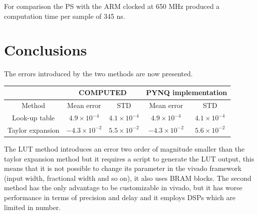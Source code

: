 \documentclass[12pt]{article}
\begin{document}
For comparison the PS with the ARM clocked at 650 MHz produced a computation time per sample of 345 ns.

\section{Conclusions}

The errors introduced by the two methods are now presented.
\begin{table}[h]
\begin{tabular}{c||cc|cc}
&\multicolumn{2}{c|}{COMPUTED}&\multicolumn{2}{c}{PYNQ implementation} \\ \hline 
Method           & Mean error  & STD & Mean error  & STD  \\ \hline
Look-up table    & $4.9\times 10^{-4}$ & $4.1\times 10^{-4}$  & $4.9\times 10^{-4}$ & $4.1\times 10^{-4}$ \\
Taylor expansion & $-4.3\times 10^{-2}$ & $5.5\times 10^{-2}$ & $-4.3\times 10^{-2}$ & $5.6\times 10^{-2}$ \\
\end{tabular}
\end{table}
The LUT method introduces an error two order of magnitude smaller than the taylor expansion method but it requires a script to generate the LUT output, this means that it is not possible to change its parameter in the vivado framework (input width, fractional width and so on), it also uses BRAM blocks.  
The second method has the only advantage to be customizable in vivado, but it has worse performance in terms of precision and delay and it employs DSPs which are limited in number.
\end{document}

